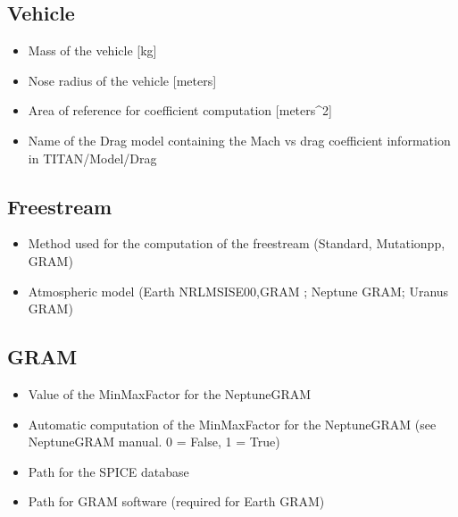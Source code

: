 \documentclass[letterpaper,10pt,english]{sphinxmanual}
\begin{document}
\subsection{Vehicle}
\label{\detokenize{usage:vehicle}}\begin{itemize}
\item {} 
\sphinxAtStartPar
{} \sphinxhyphen{} Mass of the vehicle {[}kg{]}

\item {} 
\sphinxAtStartPar
{} \sphinxhyphen{} Nose radius of the vehicle {[}meters{]}

\item {} 
\sphinxAtStartPar
{} \sphinxhyphen{} Area of reference for coefficient computation  {[}meters\textasciicircum{}2{]}

\item {} 
\sphinxAtStartPar
{} \sphinxhyphen{} Name of the Drag model containing the Mach vs drag coefficient information in TITAN/Model/Drag

\end{itemize}


\subsection{Freestream}
\label{\detokenize{usage:freestream}}\begin{itemize}
\item {} 
\sphinxAtStartPar
{} \sphinxhyphen{} Method used for the computation of the freestream (Standard, Mutationpp, GRAM)

\item {} 
\sphinxAtStartPar
{} \sphinxhyphen{} Atmospheric model (Earth \sphinxhyphen{} NRLMSISE00,GRAM ; Neptune \sphinxhyphen{} GRAM; Uranus \sphinxhyphen{} GRAM)

\end{itemize}


\subsection{GRAM}
\label{\detokenize{usage:gram}}\begin{itemize}
\item {} 
\sphinxAtStartPar
{} \sphinxhyphen{} Value of the MinMaxFactor for the NeptuneGRAM

\item {} 
\sphinxAtStartPar
{} \sphinxhyphen{} Automatic computation of the MinMaxFactor for the NeptuneGRAM (see NeptuneGRAM manual. 0 = False, 1 = True)

\item {} 
\sphinxAtStartPar
{} \sphinxhyphen{} Path for the SPICE database

\item {} 
\sphinxAtStartPar
{} \sphinxhyphen{} Path for GRAM software (required for Earth GRAM)

\end{itemize}
\end{document}
